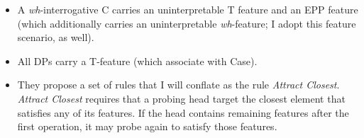 \singlespacing
\begin{minipage}{5in}
\begin{itemize}
\item A {\it wh}-interrogative C carries an uninterpretable T feature and an EPP feature (which additionally carries an uninterpretable {\it wh}-feature; I adopt this feature scenario, as well).
\item All DPs carry a T-feature (which \citeauthor{pesetsky_torrego2001} associate with Case).
\item They propose a set of rules that I will conflate as the rule {\it Attract Closest}. {\it Attract Closest} requires that a probing head target the closest element that satisfies any of its features. If the head contains remaining features after the first operation, it may probe again to satisfy those features.

\end{itemize}
\end{minipage}\\\\\\
\onehalfspacing
